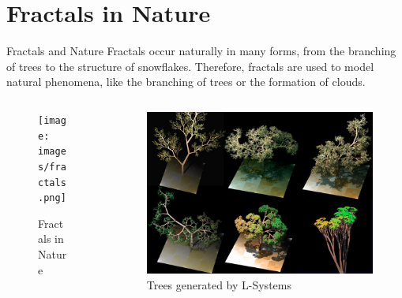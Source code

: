 \section{Fractals in Nature}
\begin{frame}{Fractals and Nature}
  Fractals occur naturally in many forms, from the branching of trees to the structure of snowflakes.
  Therefore, fractals are used to model natural phenomena, like the branching of trees or the formation of clouds.
  \begin{columns}
    \begin{column}{0.5\textwidth}
      \begin{center}
        \begin{figure}
          \texttt{[image: images/fractals.png]}
          \caption*{Fractals in Nature}
        \end{figure}
      \end{center}
    \end{column}
    \begin{column}{0.5\textwidth}
      \begin{center}
        \begin{figure}
          \includegraphics[width=\textwidth]{images/Dragon_trees.jpg}
          \caption*{Trees generated by L-Systems}
        \end{figure}
      \end{center}
    \end{column}
  \end{columns}
\end{frame}




